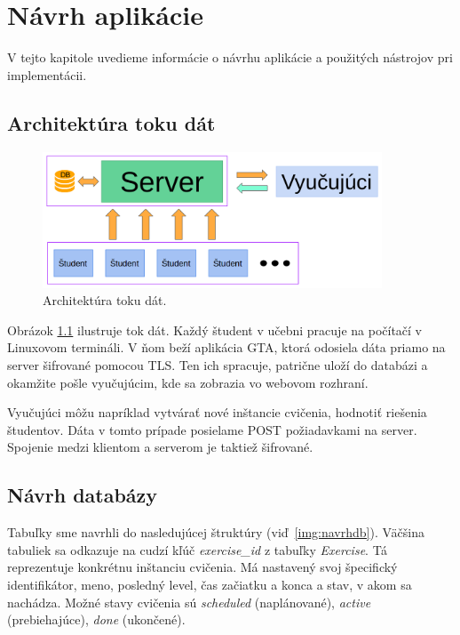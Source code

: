\chapter{Návrh aplikácie}
\label{kap:navrh}

V tejto kapitole uvedieme informácie o návrhu aplikácie a použitých nástrojov
pri implementácii.

\section{Architektúra toku dát}
\label{sec:architekturadata}

\begin{figure}[h]
	\centerline{\includegraphics[width=0.9\textwidth]{images/architekturadat.png}}
	\caption[Architektúra toku dát]{Architektúra toku dát.}
	\label{img:architekturadata}
\end{figure}

Obrázok \ref{img:architekturadata} ilustruje tok dát. Každý študent v učebni pracuje
na počítačí v Linuxovom termináli. V ňom beží aplikácia GTA, ktorá odosiela dáta
priamo na server šifrované pomocou TLS. Ten ich spracuje, patrične uloží do databázi
a okamžite pošle vyučujúcim, kde sa zobrazia vo webovom rozhraní.

Vyučujúci môžu napríklad vytvárať nové inštancie cvičenia, hodnotiť riešenia študentov.
Dáta v tomto prípade posielame POST požiadavkami na server. Spojenie medzi klientom
a serverom je taktiež šifrované.

\section{Návrh databázy}
\label{sec:navrhdb}

Tabuľky sme navrhli do nasledujúcej štruktúry (viď~\ref{img:navrhdb}).
Väčšina tabuliek sa odkazuje na cudzí kľúč \textit{exercise\_id} z tabuľky
\textit{Exercise}. Tá reprezentuje konkrétnu inštanciu cvičenia. Má nastavený svoj
špecifický identifikátor, meno, posledný level, čas začiatku a konca a stav, v
akom sa nachádza. Možné stavy cvičenia sú \textit{scheduled} (naplánované),
\textit{active} (prebiehajúce), \textit{done} (ukončené).

